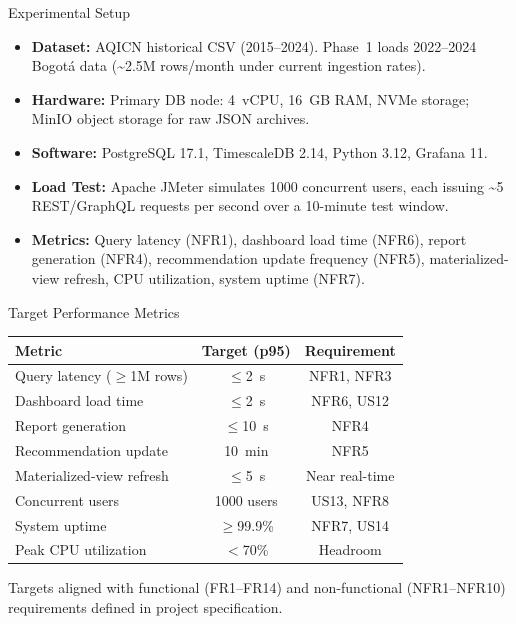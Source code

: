 \documentclass[a0paper,portrait]{baposter}
\begin{document}
\begin{poster}
\begin{posterbox}[name=experiments,column=1]{Experimental Setup}
\begin{itemize}
  \item \textbf{Dataset:} AQICN historical CSV (2015--2024). Phase~1 loads 2022--2024 Bogotá data (\textasciitilde2.5M rows/month under current ingestion rates).
  \item \textbf{Hardware:} Primary DB node: 4~vCPU, 16~GB RAM, NVMe storage; MinIO object storage for raw JSON archives.
  \item \textbf{Software:} PostgreSQL 17.1, TimescaleDB 2.14, Python 3.12, Grafana 11.
  \item \textbf{Load Test:} Apache JMeter simulates 1000 concurrent users, each issuing \textasciitilde5 REST/GraphQL requests per second over a 10-minute test window.
  \item \textbf{Metrics:} Query latency (NFR1), dashboard load time (NFR6), report generation (NFR4), recommendation update frequency (NFR5), materialized-view refresh, CPU utilization, system uptime (NFR7).
\end{itemize}
\end{posterbox}

\begin{posterbox}[name=results,column=1,below=experiments]{Target Performance Metrics}
\begin{center}
\begin{tabular}{lcc}
\toprule
\textbf{Metric} & \textbf{Target (p95)} & \textbf{Requirement}\\
\midrule
Query latency ($\geq$1M rows) & $\leq$2~s & NFR1, NFR3\\
Dashboard load time & $\leq$2~s & NFR6, US12\\
Report generation & $\leq$10~s & NFR4\\
Recommendation update & 10~min & NFR5\\
Materialized-view refresh & $\leq$5~s & Near real-time\\
Concurrent users & 1000 users & US13, NFR8\\
System uptime & $\geq$99.9\% & NFR7, US14\\
Peak CPU utilization & $<$70\% & Headroom\\
\bottomrule
\end{tabular}
\end{center}
\vspace{0.5em}
Targets aligned with functional (FR1--FR14) and non-functional (NFR1--NFR10) requirements defined in project specification.
\end{posterbox}


\end{poster}
\end{document}
